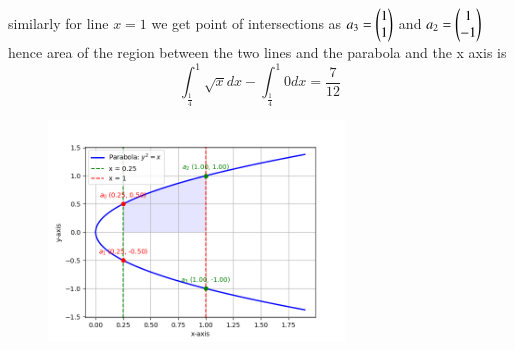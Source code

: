 \documentclass[journal]{IEEEtran}
\begin{document}
similarly for line $x=1$ we get point of intersections as $a_3=\begin{pmatrix}1\\1\end{pmatrix}$ and $a_2=\begin{pmatrix}1\\-1\end{pmatrix}$\\
hence area of the region between the two lines and the parabola and the x axis is  
$$\int_\frac{1}{4}^1\sqrt{x}dx-\int^1_\frac{1}{4} 0dx=\frac{7}{12}$$
\begin{table}[h!]
	\centering
	
\end{table}
\begin{figure}[h!]
    \centering
    \includegraphics[width=0.7\textwidth]{figs/figasgn3.png}
\end{figure}
\end{document}
